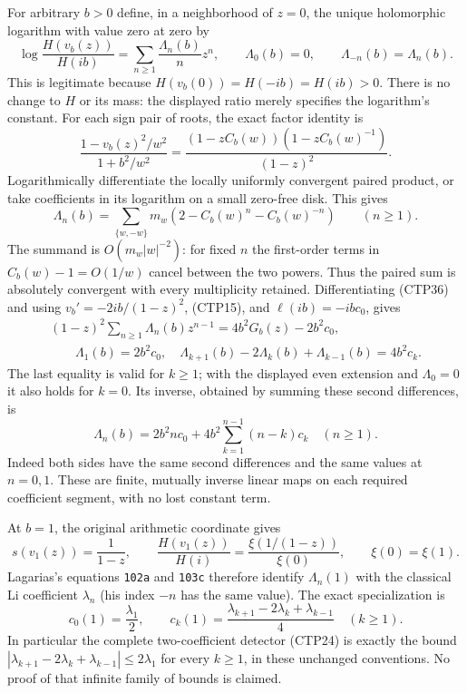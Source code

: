 For arbitrary $b>0$ define, in a neighborhood of $z=0$, the unique
holomorphic logarithm with value zero at zero by
\begin{equation}\tag{CTP36}
 \log\frac{H(v_b(z))}{H(ib)}
     =\sum_{n\ge1}\frac{\Lambda_n(b)}n z^n,
 \qquad \Lambda_0(b)=0,
 \qquad \Lambda_{-n}(b)=\Lambda_n(b).
\end{equation}
This is legitimate because $H(v_b(0))=H(-ib)=H(ib)>0$.
There is no change to $H$ or its mass: the displayed ratio merely
specifies the logarithm's constant. For each sign pair of roots,
the exact factor identity is
\[
 \frac{1-v_b(z)^2/w^2}{1+b^2/w^2}
 =\frac{(1-zC_b(w))(1-zC_b(w)^{-1})}{(1-z)^2}.
\]
Logarithmically differentiate the locally uniformly convergent
paired product, or take coefficients in its logarithm on a small
zero-free disk. This gives
\begin{equation}\tag{CTP37}
 \Lambda_n(b)=\sum_{\{w,-w\}}m_w
                 (2-C_b(w)^n-C_b(w)^{-n})\qquad(n\ge1).
\end{equation}
The summand is $O(m_w|w|^{-2})$: for fixed $n$ the first-order
terms in $C_b(w)-1=O(1/w)$ cancel between the two powers.
Thus the paired sum is absolutely convergent with every
multiplicity retained.
Differentiating (CTP36) and using
$v_b'=-2ib/(1-z)^2$, (CTP15), and
$\ell(ib)=-ibc_0$, gives
\begin{equation}\tag{CTP38}\begin{gathered}
 (1-z)^2\sum_{n\ge1}\Lambda_n(b)z^{n-1}
           =4b^2G_b(z)-2b^2c_0,\\
 \qquad
 \Lambda_1(b)=2b^2c_0,\quad
 \Lambda_{k+1}(b)-2\Lambda_k(b)+\Lambda_{k-1}(b)=4b^2c_k.\end{gathered}
\end{equation}
The last equality is valid for $k\ge1$; with the displayed even
extension and $\Lambda_0=0$ it also holds for $k=0$.
Its inverse, obtained by summing these second differences, is
\begin{equation}\tag{CTP39}
 \Lambda_n(b)=2b^2nc_0+4b^2\sum_{k=1}^{n-1}(n-k)c_k
 \quad(n\ge1).
\end{equation}
Indeed both sides have the same second differences and the same
values at $n=0,1$. These are finite, mutually inverse linear maps
on each required coefficient segment, with no lost constant term.

At $b=1$, the original arithmetic coordinate gives
\begin{equation}\tag{CTP40}
 s(v_1(z))=\frac1{1-z},\qquad
 \frac{H(v_1(z))}{H(i)}
     =\frac{\xi(1/(1-z))}{\xi(0)},\qquad
 \xi(0)=\xi(1).
\end{equation}
Lagarias's equations \texttt{102a} and \texttt{103c} therefore
identify $\Lambda_n(1)$ with the classical Li coefficient
$\lambda_n$ (his index $-n$ has the same value).
The exact specialization is
\begin{equation}\tag{CTP41}
 c_0(1)=\frac{\lambda_1}{2},\qquad
 c_k(1)=\frac{\lambda_{k+1}-2\lambda_k+\lambda_{k-1}}4
 \quad(k\ge1).
\end{equation}
In particular the complete two-coefficient detector (CTP24)
is exactly the bound
$|\lambda_{k+1}-2\lambda_k+\lambda_{k-1}|\le2\lambda_1$
for every $k\ge1$, in these unchanged conventions. No proof of
that infinite family of bounds is claimed.

